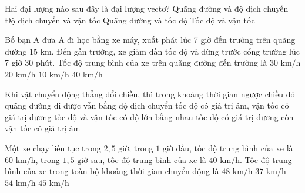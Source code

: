 \begin{ex} Hai đại lượng nào sau đây là đại lượng vectơ?
\choice
{Quãng đường và độ dịch chuyển}
{\True Độ dịch chuyển và vận tốc}
{Quãng đường và tốc độ}
{Tốc độ và vận tốc}
\end{ex}

\begin{ex} Bố bạn A đưa A đi học bằng xe máy, xuất phát lúc 7 giờ đến trường trên quãng đường $15\text{ km}$. Đến gần trường, xe giảm dần tốc độ và dừng trước cổng trường lúc 7 giờ 30 phút. Tốc độ trung bình của xe trên quãng đường đến trường là
\choice
{\True $30\text{ km/h}$}
{$20\text{ km/h}$}
{$10\text{ km/h}$}
{$40\text{ km/h}$}
\end{ex}

\begin{ex} Khi vật chuyển động thẳng đổi chiều, thì trong khoảng thời gian ngược chiều đó
\choice
{quãng đường đi được vẫn bằng độ dịch chuyển}
{tốc độ có giá trị âm, vận tốc có giá trị dương}
{\True tốc độ và vận tốc có độ lớn bằng nhau}
{tốc độ có giá trị dương còn vận tốc có giá trị âm}
\end{ex}

\begin{ex} Một xe chạy liên tục trong $2{,}5\text{ giờ}$, trong $1\text{ giờ}$ đầu, tốc độ trung bình của xe là $60\text{ km/h}$, trong $1{,}5\text{ giờ}$ sau, tốc độ trung bình của xe là $40\text{ km/h}$. Tốc độ trung bình của xe trong toàn bộ khoảng thời gian chuyển động là
\choice
{\True $48\text{ km/h}$}
{$37\text{ km/h}$}
{$54\text{ km/h}$}
{$45\text{ km/h}$}
\end{ex}

